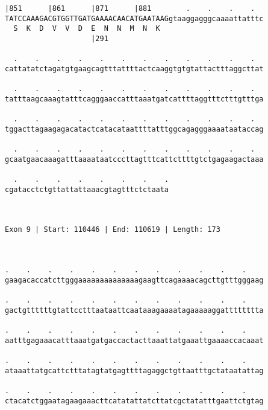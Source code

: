 \documentclass{article}
\begin{document}
\begin{Verbatim}
|851      |861      |871      |881        .    .    .    .  
TATCCAAAGACGTGGTTGATGAAAACAACATGAATAAGgtaaggagggcaaaattatttc
  S  K  D  V  V  D  E  N  N  M  N  K                        
                    |291                                    
  
  .    .    .    .    .    .    .    .    .    .    .    .  
cattatatctagatgtgaagcagtttattttactcaaggtgtgtattactttaggcttat
                                                            
  .    .    .    .    .    .    .    .    .    .    .    .  
tatttaagcaaagtatttcagggaaccatttaaatgatcattttaggtttctttgtttga
                                                            
  .    .    .    .    .    .    .    .    .    .    .    .  
tggacttagaagagacatactcatacataattttatttggcagagggaaaataataccag
                                                            
  .    .    .    .    .    .    .    .    .    .    .    .  
gcaatgaacaaagatttaaaataatcccttagtttcattcttttgtctgagaagactaaa
                                                            
  .    .    .    .    .    .    .    .
cgatacctctgttattattaaacgtagtttctctaata
                                      
                                      
 
Exon 9 | Start: 110446 | End: 110619 | Length: 173



.    .    .    .    .    .    .    .    .    .    .    .    
gaagacaccatcttgggaaaaaaaaaaaaaagaagttcagaaaacagcttgtttgggaag
                                                            
.    .    .    .    .    .    .    .    .    .    .    .    
gactgttttttgtattcctttaataattcaataaagaaaatagaaaaaggatttttttta
                                                            
.    .    .    .    .    .    .    .    .    .    .    .    
aatttgagaaacatttaaatgatgaccactacttaaattatgaaattgaaaaccacaaat
                                                            
.    .    .    .    .    .    .    .    .    .    .    .    
ataaattatgcattctttatagtatgagttttagaggctgttaatttgctataatattag
                                                            
.    .    .    .    .    .    .    .    .    .    .    .    
ctacatctggaatagaagaaacttcatatattatcttatcgctatatttgaattctgtag
                                                            

\end{Verbatim}
\end{document}
